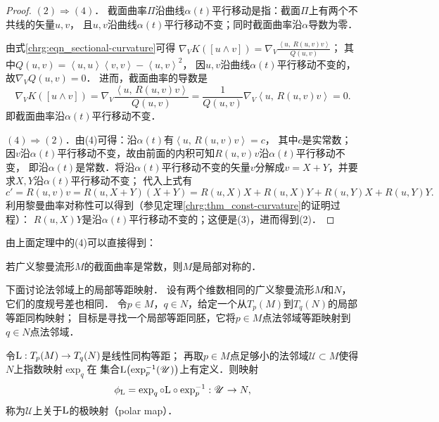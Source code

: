 \begin{proof}
    $(2) \Rightarrow (4)$．
    截面曲率$\Pi$沿曲线$\alpha(t)$平行移动是指：截面$\Pi$上有两个不共线的矢量$u,v$，
    且$u,v$沿曲线$\alpha(t)$平行移动不变；同时截面曲率沿$\alpha$导数为零．
    
    由式\eqref{chrg:eqn_sectional-curvature}可得
    $ \nabla_V K([u\wedge v]) =  \nabla_V \frac{\left<u,\ R (u, v) v \right>}{Q(u,v)} $；
    其中$Q(u,v)= \left<u,u\right> \left<v,v\right> -   \left<u,v\right>^2 $，
    因$u,v$沿曲线$\alpha(t)$平行移动不变的，故$\nabla_V Q(u,v)=0$．
    进而，截面曲率的导数是
    \begin{equation}
    \nabla_V K([u\wedge v]) =  \nabla_V \frac{\left<u,\,R (u, v) v \right>}{Q(u,v)}
    = \frac{1}{Q(u,v)} \nabla_V \left<u,\, R (u, v) v \right> = 0 .
    \end{equation}
    即截面曲率沿$\alpha(t)$平行移动不变．
    
    $(4)\Rightarrow (2)$．由(4)可得：沿$\alpha(t)$有$\left<u,\, R (u, v) v \right>= c $，
    其中$c$是实常数；因$v$沿$\alpha(t)$平行移动不变，故由前面的内积可知$R (u, v) v$沿$\alpha(t)$平行移动不变，
    即沿$\alpha(t)$是常数．将沿$\alpha(t)$平行移动不变的矢量$v$分解成$v=X+Y$，并要求$X,Y$沿$\alpha(t)$平行移动不变；
    代入上式有
    \begin{equation*}
        c'= R (u, v) v = R (u,X+Y) (X+Y)=R (u,X) X + R (u,X) Y+R (u,Y) X+R (u,Y) Y .
    \end{equation*}
    利用黎曼曲率对称性可以得到（参见定理\ref{chrg:thm_const-curvature}的证明过程）：
    $R (u,X) Y$是沿$\alpha(t)$平行移动不变的；这便是(3)，进而得到(2)．
\end{proof}

由上面定理中的(4)可以直接得到：
\begin{corollary}
    若广义黎曼流形$M$的截面曲率是常数，则$M$是局部对称的．
\end{corollary}


下面讨论法邻域上的局部等距映射．
设有两个维数相同的广义黎曼流形$M$和$N$，它们的度规号差也相同．
令$p\in M$，$q\in N$，给定一个从$T_p(M)$到$T_q(N)$的局部等距同构映射；
目标是寻找一个局部等距同胚，它将$p\in M$点法邻域等距映射到$q\in N$点法邻域．


\begin{definition}\label{chhss:def_polarmap}
    令${\rm L }:T_p(M)\to T_q(N)$是线性同构等距；
    再取$p\in M$点足够小的法邻域$\mathscr{U}\subset M$使得$N$上指数映射$\exp_q$在
    集合${\rm  L}\bigl(\exp_p^{-1}(\mathscr{U})\bigr)$上有定义．则映射
    \begin{equation}\label{chhss:eqn_polarmap}
        \phi_{\rm L} = \exp_q \circ {\rm L}\circ \exp^{-1}_p : \mathscr{U}\to N ,
    \end{equation}
    称为$\mathscr{U}$上关于$\rm L$的{\heiti 极映射}（polar map）．
\end{definition}

